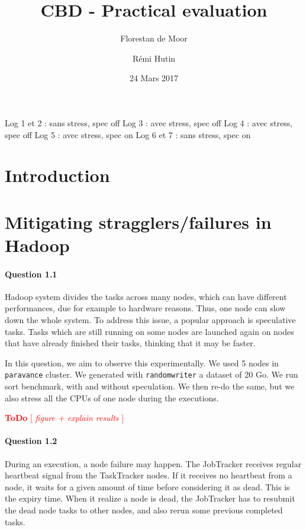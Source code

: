 \documentclass[a4paper]{article}
\newcommand{\todo}[1]{\textcolor{red}{\textbf{ToDo} [ \emph{#1} ]}}
\begin{document}
\title{CBD - Practical evaluation}
\author{Florestan de Moor}
\author{Rémi Hutin}
\date{24 Mars 2017}

\maketitle

Log 1 et 2 : sans stress, spec off
Log 3 : avec stress, spec off
Log 4 : avec stress, spec off
Log 5 : avec stress, spec on
Log 6 et 7 : sans stress, spec on







\section*{Introduction}

\section{Mitigating stragglers/failures in Hadoop}

\paragraph{Question 1.1}

Hadoop system divides the tasks across many nodes, which can have different performances, due for example to hardware reasons.
Thus, one node can slow down the whole system.
To address this issue, a popular approach is speculative tasks.
Tasks which are still running on some nodes are launched again on nodes that have already finished their tasks, thinking that it may be faster.

In this question, we aim to observe this experimentally.
We used 5 nodes in \texttt{paravance} cluster.
We generated with \texttt{randomwriter} a dataset of 20 Go.
We run sort benchmark, with and without speculation.
We then re-do the same, but we also stress all the CPUs of one node during the executions.

\todo{ figure + explain results }


\paragraph{Question 1.2}

During an execution, a node failure may happen.
The JobTracker receives regular heartbeat signal from the TaskTracker nodes.
If it receives no heartbeat from a node, it waits for a given amount of time before considering it as dead.
This is the expiry time.
When it realize a node is dead, the JobTracker has to resubmit the dead node tasks to other nodes,
and also rerun some previous completed tasks.
\end{document}
